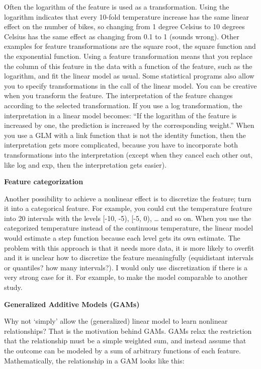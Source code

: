 \documentclass[
  10pt,
]{scrbook}
\begin{document}
Often the logarithm of the feature is used as a transformation.
Using the logarithm indicates that every 10-fold temperature increase has the same linear effect on the number of bikes, so changing from 1 degree Celsius to 10 degrees Celsius has the same effect as changing from 0.1 to 1 (sounds wrong).
Other examples for feature transformations are the square root, the square function and the exponential function.
Using a feature transformation means that you replace the column of this feature in the data with a function of the feature, such as the logarithm, and fit the linear model as usual.
Some statistical programs also allow you to specify transformations in the call of the linear model.
You can be creative when you transform the feature.
The interpretation of the feature changes according to the selected transformation.
If you use a log transformation, the interpretation in a linear model becomes:
``If the logarithm of the feature is increased by one, the prediction is increased by the corresponding weight.''
When you use a GLM with a link function that is not the identity function, then the interpretation gets more complicated, because you have to incorporate both transformations into the interpretation (except when they cancel each other out, like log and exp, then the interpretation gets easier).

\textbf{Feature categorization}

Another possibility to achieve a nonlinear effect is to discretize the feature; turn it into a categorical feature.
For example, you could cut the temperature feature into 20 intervals with the levels {[}-10, -5), {[}-5, 0), \ldots{} and so on.
When you use the categorized temperature instead of the continuous temperature, the linear model would estimate a step function because each level gets its own estimate.
The problem with this approach is that it needs more data, it is more likely to overfit and it is unclear how to discretize the feature meaningfully (equidistant intervals or quantiles? how many intervals?).
I would only use discretization if there is a very strong case for it.
For example, to make the model comparable to another study.

\textbf{Generalized Additive Models (GAMs)}

Why not `simply' allow the (generalized) linear model to learn nonlinear relationships?
That is the motivation behind GAMs.
GAMs relax the restriction that the relationship must be a simple weighted sum, and instead assume that the outcome can be modeled by a sum of arbitrary functions of each feature.
Mathematically, the relationship in a GAM looks like this:
\end{document}
